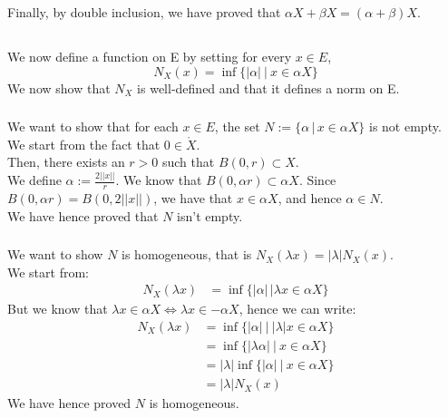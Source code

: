 \documentclass{article}
\begin{document}
\noindent Finally, by double inclusion, we have proved that $\alpha X + \beta X = (\alpha + \beta )X$. \\



\subsection{}%
We now define a function on E by setting for every $x \in E$, $$N_X(x) = \inf\{|\alpha| \ | \ x \in \alpha X \}$$
We now show that $N_X$ is well-defined and that it defines a norm on E. 

\subsubsection{}%

We want to show that for each $x \in E$, the set $N := \{\alpha \,|\, x \in \alpha X\}$ is not empty. \\

\noindent We start from the fact that $0 \in \mathring{X}$. \\
Then, there exists an $r > 0$ such that $B(0,r) \subset X$. \\
We define $\alpha := \frac{2||x||}{r}$. We know that $B(0,\alpha r) \subset \alpha X$. Since $B(0, \alpha r) = B(0, 2||x||)$, we have that $x \in \alpha X$, and hence $\alpha \in N$. \\

\noindent We have hence proved that $N$ isn't empty.

\subsubsection{}%

We want to show $N$ is homogeneous, that is $N_X(\lambda x) = |\lambda|N_X(x)$. \\

\noindent We start from:
\begin{align*}
	N_X(\lambda x) &= \inf\{|\alpha | \, | \lambda x \in \alpha X\}
\end{align*}
But we know that $\lambda x \in \alpha X \Leftrightarrow \lambda x \in -\alpha X$, hence we can write:
\begin{align*}
	N_X(\lambda x) &= \inf\{|\alpha | \ | \ |\lambda| x \in \alpha X\}\\
	&= \inf\{|\lambda \alpha | \ | \ x \in \alpha X\}\\
	&= |\lambda|\inf\{|\alpha | \ | \ x \in \alpha X\}\\
	&= |\lambda|N_X(x)
\end{align*}
We have hence proved $N$ is homogeneous.
\end{document}
